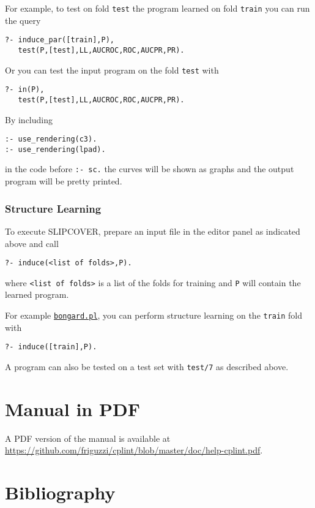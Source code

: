 \documentclass[a4paper,10pt]{article}
\begin{document}
For example, to test on fold \verb|test| the program learned on fold \verb|train| you can run the query
\begin{verbatim}
?- induce_par([train],P),
   test(P,[test],LL,AUCROC,ROC,AUCPR,PR).
\end{verbatim}
Or you can test the input program on the fold \verb|test| with
\begin{verbatim}
?- in(P),
   test(P,[test],LL,AUCROC,ROC,AUCPR,PR).
\end{verbatim}
By including
\begin{verbatim}
:- use_rendering(c3).
:- use_rendering(lpad).
\end{verbatim}
in the code before \verb|:- sc.| the curves will be shown as graphs and the output program will be pretty printed.



\subsubsection{Structure Learning}
To execute SLIPCOVER,
prepare an input file in the editor panel as indicated above 
and call
\begin{verbatim}
?- induce(<list of folds>,P).
\end{verbatim}
where \verb|<list of folds>| is a list of the folds for training and
\verb|P| will contain the learned program.

For example \href{http://cplint.lamping.unife.it/example/bongard.pl}{\texttt{bongard.pl}}, you can perform structure learning on the \verb|train| fold with 
\begin{verbatim}
?- induce([train],P).
\end{verbatim}
A program can also be tested on a test set with \verb|test/7| as
described above.



\section{Manual in PDF}
A PDF version of the manual is available at
\url{https://github.com/friguzzi/cplint/blob/master/doc/help-cplint.pdf}.
\section{Bibliography}


\end{document}
